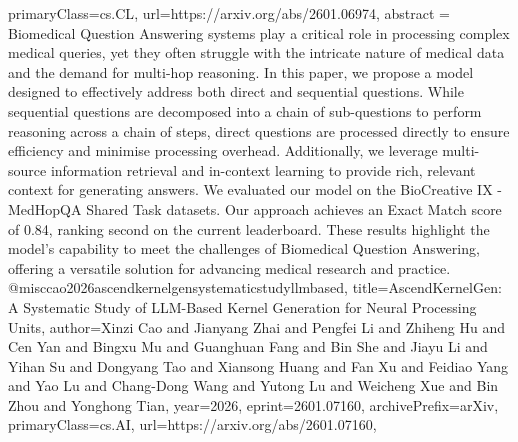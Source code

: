{      primaryClass={cs.CL},
      url={https://arxiv.org/abs/2601.06974},
      abstract = {Biomedical Question Answering systems play a critical role in processing complex medical queries, yet they often struggle with the intricate nature of medical data and the demand for multi-hop reasoning. In this paper, we propose a model designed to effectively address both direct and sequential questions. While sequential questions are decomposed into a chain of sub-questions to perform reasoning across a chain of steps, direct questions are processed directly to ensure efficiency and minimise processing overhead. Additionally, we leverage multi-source information retrieval and in-context learning to provide rich, relevant context for generating answers. We evaluated our model on the BioCreative IX - MedHopQA Shared Task datasets. Our approach achieves an Exact Match score of 0.84, ranking second on the current leaderboard. These results highlight the model's capability to meet the challenges of Biomedical Question Answering, offering a versatile solution for advancing medical research and practice.}
}@misc{cao2026ascendkernelgensystematicstudyllmbased,
      title={AscendKernelGen: A Systematic Study of LLM-Based Kernel Generation for Neural Processing Units}, 
      author={Xinzi Cao and Jianyang Zhai and Pengfei Li and Zhiheng Hu and Cen Yan and Bingxu Mu and Guanghuan Fang and Bin She and Jiayu Li and Yihan Su and Dongyang Tao and Xiansong Huang and Fan Xu and Feidiao Yang and Yao Lu and Chang-Dong Wang and Yutong Lu and Weicheng Xue and Bin Zhou and Yonghong Tian},
      year={2026},
      eprint={2601.07160},
      archivePrefix={arXiv},
      primaryClass={cs.AI},
      url={https://arxiv.org/abs/2601.07160},
}
